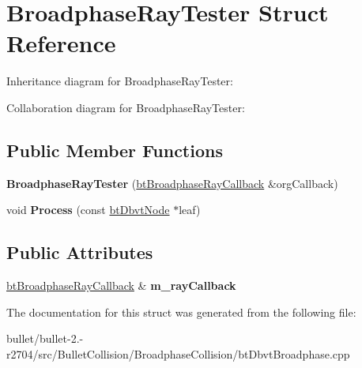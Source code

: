 \hypertarget{struct_broadphase_ray_tester}{\section{Broadphase\+Ray\+Tester Struct Reference}
\label{struct_broadphase_ray_tester}
}


Inheritance diagram for Broadphase\+Ray\+Tester\+:


Collaboration diagram for Broadphase\+Ray\+Tester\+:
\subsection*{Public Member Functions}
\begin{DoxyCompactItemize}
\item 
\hypertarget{struct_broadphase_ray_tester_aa0e0bf4dca0a049ad6fc26bfb2801aaa}{{\bfseries Broadphase\+Ray\+Tester} (\hyperlink{structbt_broadphase_ray_callback}{bt\+Broadphase\+Ray\+Callback} \&org\+Callback)}\label{struct_broadphase_ray_tester_aa0e0bf4dca0a049ad6fc26bfb2801aaa}

\item 
\hypertarget{struct_broadphase_ray_tester_a2a9dd034c197741d920ac0e3d1106e6a}{void {\bfseries Process} (const \hyperlink{structbt_dbvt_node}{bt\+Dbvt\+Node} $\ast$leaf)}\label{struct_broadphase_ray_tester_a2a9dd034c197741d920ac0e3d1106e6a}

\end{DoxyCompactItemize}
\subsection*{Public Attributes}
\begin{DoxyCompactItemize}
\item 
\hypertarget{struct_broadphase_ray_tester_adefb860129739c77c01a78b3b9515081}{\hyperlink{structbt_broadphase_ray_callback}{bt\+Broadphase\+Ray\+Callback} \& {\bfseries m\+\_\+ray\+Callback}}\label{struct_broadphase_ray_tester_adefb860129739c77c01a78b3b9515081}

\end{DoxyCompactItemize}


The documentation for this struct was generated from the following file\+:\begin{DoxyCompactItemize}
\item 
bullet/bullet-\/2.-\/r2704/src/\+Bullet\+Collision/\+Broadphase\+Collision/bt\+Dbvt\+Broadphase.\+cpp\end{DoxyCompactItemize}
